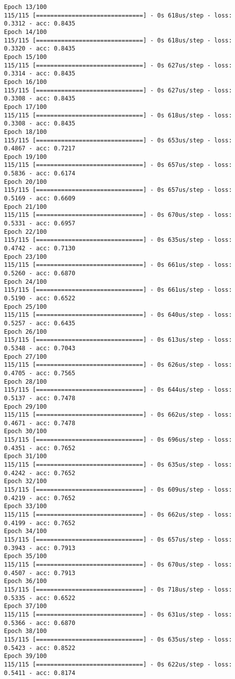 \documentclass[11pt]{article}
\begin{document}
\begin{Verbatim}[commandchars=\\\{\}]
Epoch 13/100
115/115 [==============================] - 0s 618us/step - loss: 0.3312 - acc: 0.8435
Epoch 14/100
115/115 [==============================] - 0s 618us/step - loss: 0.3320 - acc: 0.8435
Epoch 15/100
115/115 [==============================] - 0s 627us/step - loss: 0.3314 - acc: 0.8435
Epoch 16/100
115/115 [==============================] - 0s 627us/step - loss: 0.3308 - acc: 0.8435
Epoch 17/100
115/115 [==============================] - 0s 618us/step - loss: 0.3308 - acc: 0.8435
Epoch 18/100
115/115 [==============================] - 0s 653us/step - loss: 0.4867 - acc: 0.7217
Epoch 19/100
115/115 [==============================] - 0s 657us/step - loss: 0.5836 - acc: 0.6174
Epoch 20/100
115/115 [==============================] - 0s 657us/step - loss: 0.5169 - acc: 0.6609
Epoch 21/100
115/115 [==============================] - 0s 670us/step - loss: 0.5331 - acc: 0.6957
Epoch 22/100
115/115 [==============================] - 0s 635us/step - loss: 0.4742 - acc: 0.7130
Epoch 23/100
115/115 [==============================] - 0s 661us/step - loss: 0.5260 - acc: 0.6870
Epoch 24/100
115/115 [==============================] - 0s 661us/step - loss: 0.5190 - acc: 0.6522
Epoch 25/100
115/115 [==============================] - 0s 640us/step - loss: 0.5257 - acc: 0.6435
Epoch 26/100
115/115 [==============================] - 0s 613us/step - loss: 0.5348 - acc: 0.7043
Epoch 27/100
115/115 [==============================] - 0s 626us/step - loss: 0.4705 - acc: 0.7565
Epoch 28/100
115/115 [==============================] - 0s 644us/step - loss: 0.5137 - acc: 0.7478
Epoch 29/100
115/115 [==============================] - 0s 662us/step - loss: 0.4671 - acc: 0.7478
Epoch 30/100
115/115 [==============================] - 0s 696us/step - loss: 0.4351 - acc: 0.7652
Epoch 31/100
115/115 [==============================] - 0s 635us/step - loss: 0.4242 - acc: 0.7652
Epoch 32/100
115/115 [==============================] - 0s 609us/step - loss: 0.4219 - acc: 0.7652
Epoch 33/100
115/115 [==============================] - 0s 662us/step - loss: 0.4199 - acc: 0.7652
Epoch 34/100
115/115 [==============================] - 0s 657us/step - loss: 0.3943 - acc: 0.7913
Epoch 35/100
115/115 [==============================] - 0s 670us/step - loss: 0.4507 - acc: 0.7913
Epoch 36/100
115/115 [==============================] - 0s 718us/step - loss: 0.5335 - acc: 0.6522
Epoch 37/100
115/115 [==============================] - 0s 631us/step - loss: 0.5366 - acc: 0.6870
Epoch 38/100
115/115 [==============================] - 0s 635us/step - loss: 0.5423 - acc: 0.8522
Epoch 39/100
115/115 [==============================] - 0s 622us/step - loss: 0.5411 - acc: 0.8174

\end{Verbatim}
\end{document}

